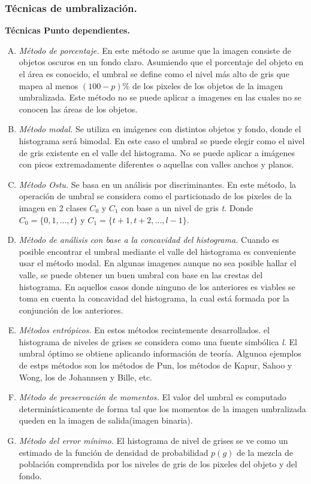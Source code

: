 \documentclass[12pt]{report}
\begin{document}
\subsubsection{Técnicas de umbralización.}
\textbf{ Técnicas Punto dependientes.}
\begin{enumerate}[A.]
\item \textit{Método de porcentaje.} En este método se asume que la imagen consiste de objetos oscuros en un fondo claro. Asumiendo que el porcentaje del objeto en el área es conocido, el umbral se define  como el nivel más alto de gris que mapea al menos $(100 - p)\%$ de los pixeles de los objetos de la imagen umbralizada. Este método no se puede aplicar a imagenes en las cuales no se conocen las áreas de los objetos.

\item \textit{Método modal.} Se utiliza en imágenes con distintos objetos y fondo, donde el histograma será bimodal. En este caso el umbral  se puede elegir como el nivel de gris existente en el valle del histograma. No se puede aplicar a imágenes con picos extremadamente diferentes o aquellas con valles anchos y planos.

\item \textit{Método Ostu.} Se basa en un análisis por discriminantes. En este método, la operación de umbral se considera como el particionado de los pixeles de la imagen en 2 clases $C_{0}$ y $C_{1}$ con base a un nivel de gris \textit{t}. Donde $C_{0} = \{0,1, ...,t\}$ y $C_{1} = \{t + 1, t +2, ..., l - 1\}$.


\item \textit{Método de análisis con base a la concavidad del histograma.} Cuando es posible encontrar el umbral mediante el valle del histograma es conveniente usar el método modal. En algunas imagenes aunque no sea posible hallar el valle, se puede obtener un buen umbral con base en las crestas del histograma. En aquellos casos donde ninguno de los anteriores es viables se toma en cuenta la concavidad del histograma, la cual está formada por la conjunción de los anteriores.

\item \textit{Métodos entrópicos.} En estos métodos recintemente desarrollados. el histograma de niveles de grises se considera como una fuente simbólica \textit{l}. El umbral óptimo se obtiene aplicando información de teoría. Algunoa ejemplos de estps métodos son los métodos de Pun, los métodos de Kapur, Sahoo y Wong, los de Johannsen y Bille, etc.

\item \textit{Método de preservación de momentos.} El valor del umbral es computado  determinísticamente de forma tal que los momentos de la imagen umbralizada queden en la imagen de salida(imagen binaria).

\item \textit{Método del error mínimo.} El histograma de nivel de grises  se ve como un estimado de la función de densidad de probabilidad $p(g)$ de la mezcla de población comprendida por los niveles de gris de los pixeles del objeto y del fondo.
\end{enumerate}
\end{document}

